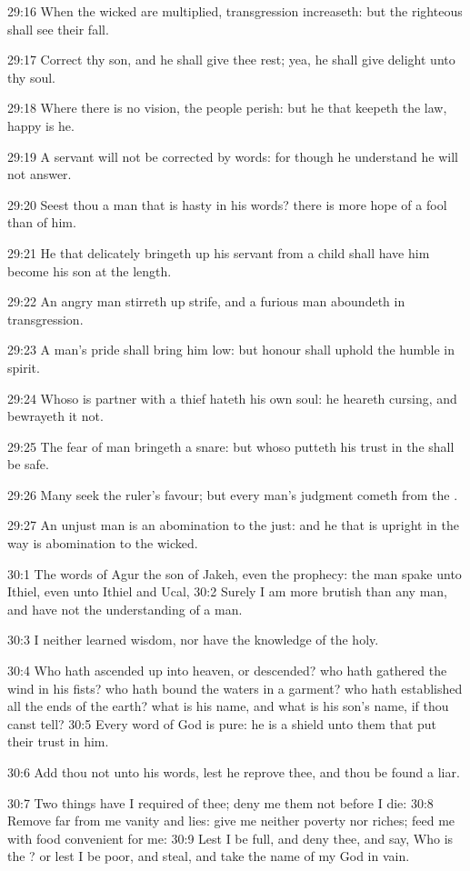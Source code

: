 29:16 When the wicked are multiplied, transgression increaseth: but
the righteous shall see their fall.

29:17 Correct thy son, and he shall give thee rest; yea, he shall give
delight unto thy soul.

29:18 Where there is no vision, the people perish: but he that keepeth
the law, happy is he.

29:19 A servant will not be corrected by words: for though he
understand he will not answer.

29:20 Seest thou a man that is hasty in his words? there is more hope
of a fool than of him.

29:21 He that delicately bringeth up his servant from a child shall
have him become his son at the length.

29:22 An angry man stirreth up strife, and a furious man aboundeth in
transgression.

29:23 A man's pride shall bring him low: but honour shall uphold the
humble in spirit.

29:24 Whoso is partner with a thief hateth his own soul: he heareth
cursing, and bewrayeth it not.

29:25 The fear of man bringeth a snare: but whoso putteth his trust in
the \LORD shall be safe.

29:26 Many seek the ruler's favour; but every man's judgment cometh
from the \LORD.

29:27 An unjust man is an abomination to the just: and he that is
upright in the way is abomination to the wicked.

30:1 The words of Agur the son of Jakeh, even the prophecy: the man
spake unto Ithiel, even unto Ithiel and Ucal, 30:2 Surely I am more
brutish than any man, and have not the understanding of a man.

30:3 I neither learned wisdom, nor have the knowledge of the holy.

30:4 Who hath ascended up into heaven, or descended? who hath gathered
the wind in his fists? who hath bound the waters in a garment? who
hath established all the ends of the earth? what is his name, and what
is his son's name, if thou canst tell?  30:5 Every word of God is
pure: he is a shield unto them that put their trust in him.

30:6 Add thou not unto his words, lest he reprove thee, and thou be
found a liar.

30:7 Two things have I required of thee; deny me them not before I
die: 30:8 Remove far from me vanity and lies: give me neither poverty
nor riches; feed me with food convenient for me: 30:9 Lest I be full,
and deny thee, and say, Who is the \LORD? or lest I be poor, and steal,
and take the name of my God in vain.

